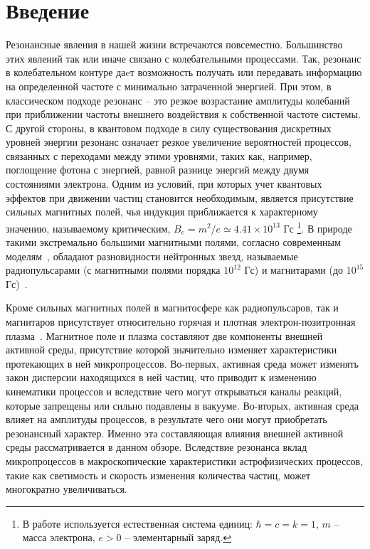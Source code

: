 \section{Введение}
Резонансные явления в нашей жизни встречаются повсеместно. Большинство этих явлений так или иначе связано с колебательными процессами. Так, резонанс в колебательном контуре даeт возможность получать или передавать информацию 
на определенной частоте с минимально затраченной энергией. При этом, в 
классическом подходе резонанс -- это резкое возрастание амплитуды колебаний при 
приближении частоты внешнего воздействия к собственной частоте системы. С 
другой стороны, в квантовом подходе в силу существования дискретных уровней 
энергии резонанс означает резкое увеличение вероятностей процессов, связанных с 
переходами между этими уровнями, таких как, например, поглощение фотона с 
энергией, равной разнице энергий между двумя состояниями электрона. Одним из 
условий, при которых учет квантовых эффектов при движении частиц становится 
необходимым, является присутствие сильных магнитных полей, чья индукция 
приближается к характерному значению, называемому критическим, $B_e = m^2 / e 
\simeq 4.41 \times 10^{13}$ Гс \footnote{В работе используется естественная 
система единиц: $\hbar = c = k = 1$, $m$ -- масса электрона, $e > 0$ --  
элементарный заряд.}. В природе такими экстремально большими магнитными полями, 
согласно современным моделям~\cite{Duncan:1995,Thompson:1996,Thompson:2002}, 
обладают разновидности нейтронных звезд, называемые радиопульсарами (с 
магнитными полями порядка $10^{12}$ Гс) и магнитарами (до $10^{15}$ 
Гс)~\cite{McGill:Cite}.

Кроме сильных магнитных полей в магнитосфере как радиопульсаров, так и магнитаров присутствует относительно горячая и плотная электрон-позитронная плазма~\cite{Duncan:1995}. Магнитное поле и плазма составляют 
две компоненты внешней активной среды, присутствие которой значительно изменяет характеристики протекающих в ней микропроцессов. Во-первых, активная среда может изменять закон дисперсии 
находящихся в ней частиц, что приводит к изменению кинематики процессов и вследствие чего могут открываться  каналы реакций, которые запрещены или сильно подавлены в вакууме. Во-вторых, активная среда 
влияет на амплитуды процессов, в результате чего они могут приобретать резонансный характер. Именно эта составляющая влияния внешней активной среды рассматривается в данном обзоре. 
Вследствие резонанса вклад микропроцессов в макроскопические характеристики астрофизических процессов, такие как светимость и скорость изменения количества частиц, может 
многократно увеличиваться.


